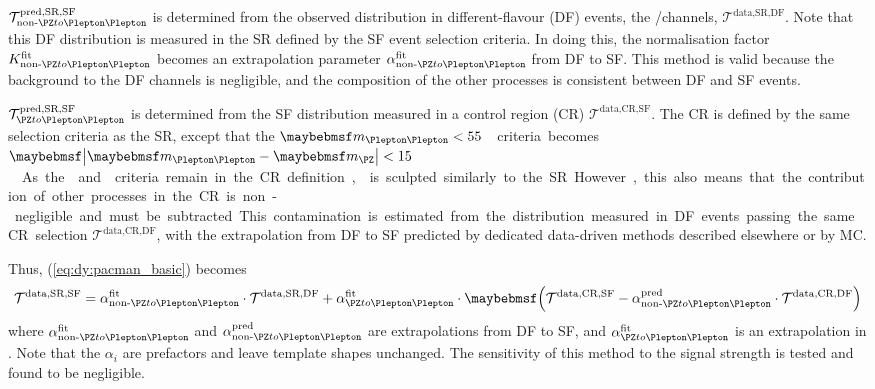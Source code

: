 $\mathcal{T}^{\text{pred,SR,SF}}_{\text{non-}\HepProcess{\PZ\HepTo\Plepton\Plepton}}$ 
is determined from the observed distribution in different-flavour (DF) events, \ie the 
\emch/\mech channels, $\mathcal{T}^{\text{data,SR,DF}}$. Note that this DF distribution 
is measured in the SR defined by the SF event selection criteria. In doing this, the 
normalisation factor $K^{\text{fit}}_{\text{non-}\HepProcess{\PZ\HepTo\Plepton\Plepton}}$ 
becomes an extrapolation parameter 
$\alpha_{\text{non-}\HepProcess{\PZ\HepTo\Plepton\Plepton}}^{\text{fit}}$ from DF to SF. 
This method is valid because the \DYll background to the DF channels is negligible, and 
the composition of the other processes is consistent between DF and SF events.

$\mathcal{T}^{\text{pred,SR,SF}}_{\HepProcess{\PZ\HepTo\Plepton\Plepton}}$ is determined 
from the SF distribution measured in a \DYll control region (CR) 
$\mathcal{T}^{\text{data,CR,SF}}$. The CR is defined by the same selection criteria as 
the SR, except that the \unit{$\mll < 55$}{\GeV} criteria becomes 
\unit{$\mods{\mll - \mZ} < 15$}{\GeV}. As the \met and \ptll criteria remain in the CR 
definition, \frecoil is sculpted similarly to the SR. However, this also means that the 
contribution of other processes in the CR is non-negligible and must be subtracted. This 
contamination is estimated from the distribution measured in DF events passing the same 
CR selection $\mathcal{T}^{\text{data,CR,DF}}$, with the extrapolation from DF to SF 
predicted by dedicated data-driven methods described elsewhere or by MC.

Thus, (\ref{eq:dy:pacman_basic}) becomes
\begin{equation}
	\mathcal{T}^{\text{data,SR,SF}} = \alpha_{\text{non-}\HepProcess{\PZ\HepTo\Plepton\Plepton}}^{\text{fit}} \cdot \mathcal{T}^{\text{data,SR,DF}} + \alpha_{\HepProcess{\PZ\HepTo\Plepton\Plepton}}^{\text{fit}} \cdot \parenths{\mathcal{T}^{\text{data,CR,SF}} - \alpha_{\text{non-}\HepProcess{\PZ\HepTo\Plepton\Plepton}}^{\text{pred}} \cdot \mathcal{T}^{\text{data,CR,DF}}}
	\label{eq:dy:pacman_full}
\end{equation}
where $\alpha_{\text{non-}\HepProcess{\PZ\HepTo\Plepton\Plepton}}^{\text{fit}}$ and 
$\alpha_{\text{non-}\HepProcess{\PZ\HepTo\Plepton\Plepton}}^{\text{pred}}$ are 
extrapolations from DF to SF, and 
$\alpha_{\HepProcess{\PZ\HepTo\Plepton\Plepton}}^{\text{fit}}$ is an extrapolation in 
\mll. Note that the $\alpha_i$ are prefactors and leave template shapes unchanged. The 
sensitivity of this method to the signal strength is tested and found to be negligible. 

